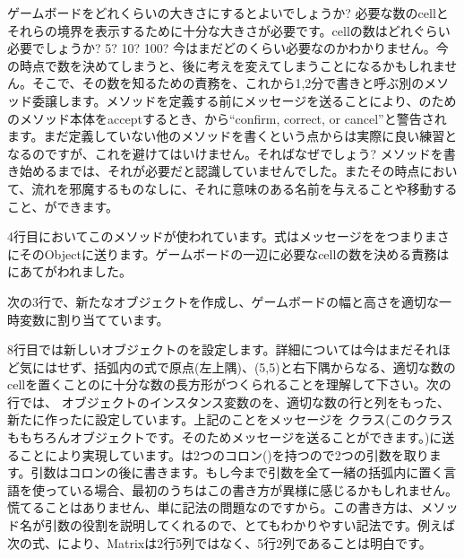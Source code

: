 \documentclass[a4paper,10pt,twoside]{book}
\begin{document}
ゲームボードをどれくらいの大きさにするとよいでしょうか? 必要な数のcellとそれらの境界を表示するために十分な大きさが必要です。cellの数はどれぐらい必要でしょうか? 5? 10? 100? 今はまだどのくらい必要なのかわかりません。今の時点で数を決めてしまうと、後に考えを変えてしまうことになるかもしれません。そこで、その数を知るための責務を、これから1,2分で書きと呼ぶ別のメソッド委譲します。メソッドを定義する前にメッセージを送ることにより、のためのメソッド本体をacceptするとき、\pharo{}から``confirm, correct, or cancel''と警告されます。まだ定義していない他のメソッドを書くという点からは実際に良い練習となるのですが、これを避けてはいけません。そればなぜでしょう? 
メソッドを書き始めるまでは、それが必要だと認識していませんでした。またその時点において、流れを邪魔するものなしに、それに意味のある名前を与えることや移動すること、ができます。

 
4行目においてこのメソッドが使われています。\st{}式はメッセージををつまりまさにそのObjectに送ります。ゲームボードの一辺に必要なcellの数を決める責務はにあてがわれました。

次の3行で、新たなオブジェクトを作成し、ゲームボードの幅と高さを適切な一時変数に割り当てています。 

8行目では新しいオブジェクトのを設定します。詳細については今はまだそれほど気にはせず、括弧内の式で原点(\ie{}左上隅)、(5,5)と右下隅からなる、適切な数のcellを置くことのに十分な数の長方形がつくられることを理解して下さい。次の行では、 オブジェクトのインスタンス変数のを、適切な数の行と列をもった、新たに作ったに設定しています。上記のことをメッセージを クラス(このクラスももちろんオブジェクトです。そのためメッセージを送ることができます。)に送ることにより実現しています。は2つのコロン(\ct{:})を持つので2つの引数を取ります。引数はコロンの後に書きます。もし今まで引数を全て一緒の括弧内に置く言語を使っている場合、最初のうちはこの書き方が異様に感じるかもしれません。慌てることはありません、単に記法の問題なのですから。この書き方は、メソッド名が引数の役割を説明してくれるので、とてもわかりやすい記法です。例えば次の式、により、Matrixは2行5列ではなく、5行2列であることは明白です。
\end{document}
